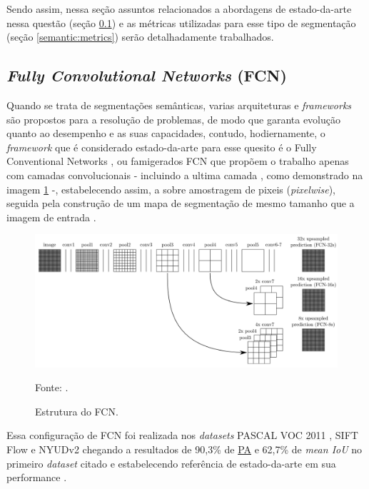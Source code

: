 Sendo assim, nessa seção assuntos relacionados a abordagens de estado-da-arte nessa questão (seção \ref{semantic:FCN}) e as métricas utilizadas para esse tipo de segmentação (seção \ref{semantic:metrics}) serão detalhadamente trabalhados.


\subsection{\textit{Fully Convolutional Networks} (FCN)}
\label{semantic:FCN}

Quando se trata de segmentações semânticas, varias arquiteturas e \textit{frameworks} são propostos para a resolução de problemas, de modo que garanta evolução quanto ao desempenho e as suas capacidades, contudo, hodiernamente, o \textit{framework} que é considerado estado-da-arte para esse quesito é o Fully Conventional Networks \cite{Shelhamer2016}, ou famigerados FCN que propõem o trabalho apenas com camadas convolucionais - incluindo a ultima camada \cite{Hesamian2019}, como demonstrado na imagem \ref{semantic:fig:5} -, estabelecendo assim,  a sobre amostragem de pixeis (\textit{pixelwise}), seguida pela construção de um mapa de segmentação de mesmo tamanho que a imagem de entrada \cite{Minaee2021, Zhang2018, Hesamian2019}.

\begin{figure}[H]
    \centering
    \caption{Estrutura do FCN.}
    \includegraphics[width=1\linewidth]{recursos/imagens/semantic/fcn_arch.png}
    \label{semantic:fig:5}

    \vspace*{1 cm}
    Fonte: \cite{Shelhamer2016}.
\end{figure}

Essa configuração de FCN foi realizada nos \textit{datasets} PASCAL VOC 2011 \cite{everingham2010pascal}, SIFT Flow \cite{Liu2011SIFTApplications} e NYUDv2 \cite{Silberman:ECCV12} chegando a resultados de 90,3\% de \hyperref[semantic:pa]{PA} e 62,7\% de \textit{mean IoU} no primeiro \textit{dataset} citado \cite{Ghosh2019} e estabelecendo referência de estado-da-arte em sua performance \cite{Minaee2021}.

